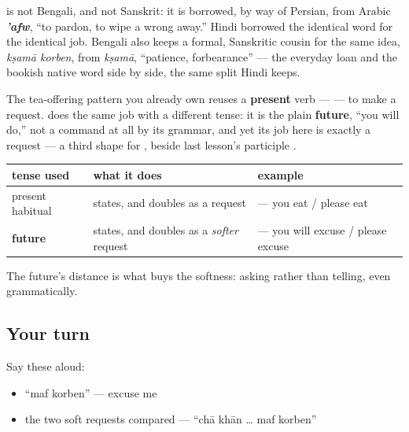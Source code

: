 \begin{cousinweb}
\textbf{} is not Bengali, and not Sanskrit: it is borrowed, by way of Persian, from Arabic \emph{\textbf{'afw}}, \textquotedblleft{}to pardon, to wipe a wrong away.\textquotedblright{} Hindi borrowed the identical word for the identical job. Bengali also keeps a formal, Sanskritic cousin for the same idea, \emph{kṣamā korben}, from \emph{kṣamā}, \textquotedblleft{}patience, forbearance\textquotedblright{} — the everyday loan and the bookish native word side by side, the same split Hindi keeps.
\end{cousinweb}

\begin{grammarlens}[title={Grammar Lens: the future, asked to be gentle}]
The tea-offering pattern you already own reuses a \textbf{present} verb —   — to make a request. \textbf{} does the same job with a different tense: it is the plain \textbf{future}, \textquotedblleft{}you will do,\textquotedblright{} not a command at all by its grammar, and yet its job here is exactly a request — a third shape for , beside last lesson's participle \textbf{}.

\noindent
\begin{tabularx}{\linewidth}{@{}>{\raggedright\arraybackslash}X>{\raggedright\arraybackslash}X>{\raggedright\arraybackslash}X@{}}
\toprule
\textbf{tense used} & \textbf{what it does} & \textbf{example} \\
\midrule
present habitual & states, and doubles as a request & \bn{আপনি} \bn{খান} — you eat / please eat \\
\textbf{future} & states, and doubles as a \emph{softer} request & \textbf{\bn{মাফ} \bn{করবেন}} — you will excuse / please excuse \\
\bottomrule
\end{tabularx}

The future's distance is what buys the softness: asking rather than telling, even grammatically.
\end{grammarlens}

\subsection*{Your turn}
Say these aloud:

\begin{itemize}
\raggedright
  \item \textquotedblleft{}maf korben\textquotedblright{} — excuse me
  \item the two soft requests compared — \textquotedblleft{}chā khān … maf korben\textquotedblright{}
\end{itemize}

